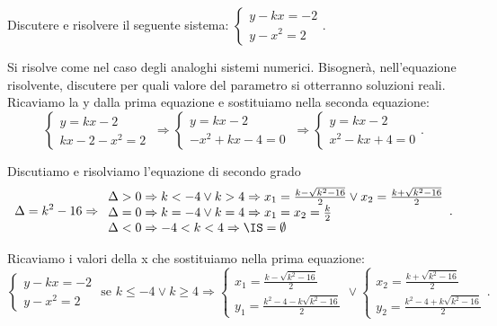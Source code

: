 \begin{esempio}{}{}
Discutere e risolvere il seguente sistema: 
\(\left\{\begin{array}{l}y-kx=-2\\y-x^2=2\end{array}\right.\).

Si risolve come nel caso degli analoghi sistemi numerici. Bisognerà, 
nell'equazione risolvente, discutere per quali valore del parametro si 
otterranno soluzioni reali. Ricaviamo la y dalla prima equazione e sostituiamo 
nella seconda equazione:
\[ \left\{\begin{array}{l}y=kx-2\\kx-2-x^2=2\end{array}\right.\ 
\Rightarrow\left\{\begin{array}{l}y=kx-2\\-x^2+kx-4=0\end{array}\right.\ 
\Rightarrow\left\{\begin{array}{l}y=kx-2\\x^2-kx+4=0\end{array}\right.. \]

Discutiamo e risolviamo l'equazione di secondo grado 
\[ \Delta =k^2-16 \Rightarrow
\begin{array}{l}\Delta >0\Rightarrow k<-4\vee k>4\Rightarrow 
x_1=\frac{k-\sqrt{k^2-16}} 2\vee x_2=\frac{k+\sqrt{k^2-16}} 2\\
\Delta =0\Rightarrow k=-4\vee k=4\Rightarrow x_1=x_2=\frac k 2 \\
\Delta <0\Rightarrow -4<k<4\Rightarrow \IS=\emptyset \end{array}. \]

Ricaviamo i valori della x che sostituiamo nella prima equazione: \[ 
\left\{\begin{array}{l}y-kx=-2\\y-x^2=2\end{array}\right.\text{ se }k\le -4\vee 
k\ge 4\Rightarrow \left\{\begin{array}{l}x_1=\frac{k-\sqrt{k^2-16}} 2 
\\y_1=\frac{k^2-4-k\sqrt{k^2-16}} 2\end{array}\right.\vee 
\left\{\begin{array}{l}x_2=\frac{k+\sqrt{k^2-16}} 2 
\\y_2=\frac{k^2-4+k\sqrt{k^2-16}} 2\end{array}\right.. \]
\end{esempio}


